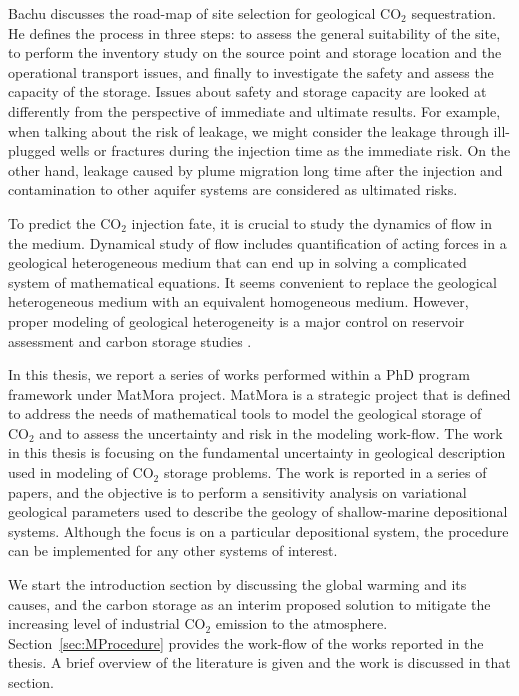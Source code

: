 Bachu \cite{bachu2000sequestration} discusses the road-map of site selection for
geological $\mbox{CO}_2$ sequestration. He defines the process in three steps:
to assess the general suitability of the site, to perform the inventory study on
the source point and storage location and the operational transport issues, and
finally to investigate the safety and assess the capacity of the storage. Issues
about safety and storage capacity are looked at differently from the perspective
of immediate and ultimate results. For example, when talking about the risk of
leakage, we might consider the leakage through ill-plugged wells or fractures
during the injection time as the immediate risk. On the other hand, leakage
caused by plume migration long time after the injection and contamination to
other aquifer systems are considered as ultimated risks. 

To predict the $\mbox{CO}_2$ injection fate, it is crucial to study the dynamics
of flow in the medium. Dynamical study of flow includes quantification of
acting forces in a geological heterogeneous medium that can end up in solving a
complicated system of mathematical equations. It seems convenient to replace the
geological heterogeneous medium with an equivalent homogeneous medium. However,
proper modeling of geological heterogeneity is a major control on reservoir
assessment and carbon storage studies
\cite{eaton2006importance,bashore1993importance,melick2009incorporating,
milliken2008effect}.

In this thesis, we report a series of works performed within a PhD program
framework under MatMora project. MatMora is a strategic project that is defined
to address the needs of mathematical tools to model the geological storage of
$\mbox{CO}_2$ and to assess the uncertainty and risk in the modeling work-flow.
The work in this thesis is focusing on the fundamental uncertainty in geological
description used in modeling of $\mbox{CO}_2$ storage problems. The work is
reported in a series of papers, and the objective is to perform a sensitivity
analysis on variational geological parameters used to describe the geology of
shallow-marine depositional systems. Although the focus is on a particular
depositional system, the procedure can be implemented for any other systems of
interest. 

We start the introduction section by discussing the global warming and its
causes, and the carbon storage as an interim proposed solution to mitigate the
increasing level of industrial $\mbox{CO}_2$ emission to the atmosphere.
Section~\ref{sec:MProcedure} provides the work-flow of the works reported in the
thesis. A brief overview of the literature is given and the work is discussed in
that section. 

